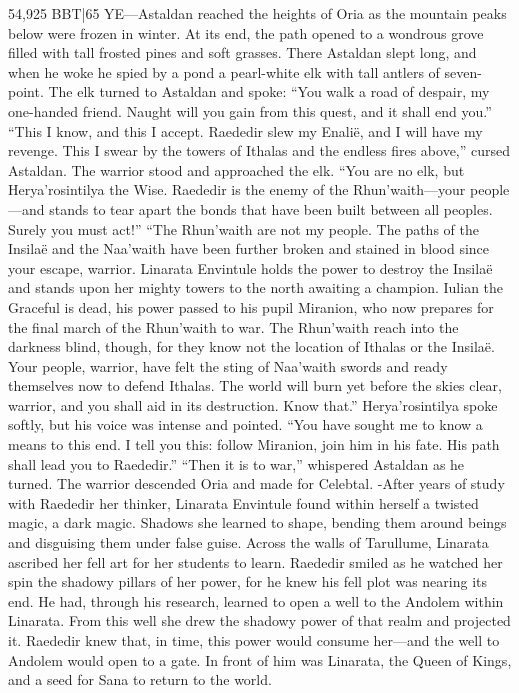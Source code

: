 \documentclass[smalldemyvopaper,11pt,twoside,onecolumn,openright,extrafontsizes]{memoir}
\begin{document}
{{54,925 BBT|65 YE—Astaldan reached the heights of Oria as the mountain peaks below were frozen in winter. At its end, the path opened to a wondrous grove filled with tall frosted pines and soft grasses. There Astaldan slept long, and when he woke he spied by a pond a pearl-white elk with tall antlers of seven-point. The elk turned to Astaldan and spoke: “You walk a road of despair, my one-handed friend. Naught will you gain from this quest, and it shall end you.”
	“This I know, and this I accept. Raededir slew my Enalië, and I will have my revenge. This I swear by the towers of Ithalas and the endless fires above,” cursed Astaldan. The warrior stood and approached the elk. “You are no elk, but Herya’rosintilya the Wise. Raededir is the enemy of the Rhun’waith—your people—and stands to tear apart the bonds that have been built between all peoples. Surely you must act!”
	“The Rhun’waith are not my people. The paths of the Insilaë and the Naa’waith have been further broken and stained in blood since your escape, warrior. Linarata Envintule holds the power to destroy the Insilaë and stands upon her mighty towers to the north awaiting a champion. Iulian the Graceful is dead, his power passed to his pupil Miranion, who now prepares for the final march of the Rhun’waith to war. The Rhun’waith reach into the darkness blind, though, for they know not the location of Ithalas or the Insilaë. Your people, warrior, have felt the sting of Naa’waith swords and ready themselves now to defend Ithalas. The world will burn yet before the skies clear, warrior, and you shall aid in its destruction. Know that.” Herya’rosintilya spoke softly, but his voice was intense and pointed. “You have sought me to know a means to this end. I tell you this: follow Miranion, join him in his fate. His path shall lead you to Raededir.”
	“Then it is to war,” whispered Astaldan as he turned. The warrior descended Oria and made for Celebtal.
-After years of study with Raededir her thinker, Linarata Envintule found within herself a twisted magic, a dark magic. Shadows she learned to shape, bending them around beings and disguising them under false guise.  Across the walls of Tarullume, Linarata ascribed her fell art for her students to learn. Raededir smiled as he watched her spin the shadowy pillars of her power, for he knew his fell plot was nearing its end. He had, through his research, learned to open a well to the Andolem within Linarata. From this well she drew the shadowy power of that realm and projected it. Raededir knew that, in time, this power would consume her—and the well to Andolem would open to a gate. In front of him was Linarata, the Queen of Kings, and a seed for Sana to return to the world.

}}
\end{document}
